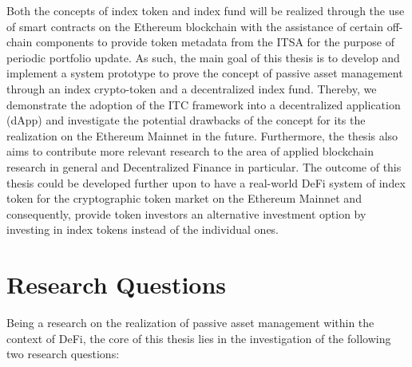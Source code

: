 
Both the concepts of index token and index fund will be realized through the use of smart contracts on the Ethereum blockchain with the assistance of certain off-chain components to provide token metadata from the ITSA for the purpose of periodic portfolio update. As such, the main goal of this thesis is to develop and implement a system prototype to prove the concept of passive asset management through an index crypto-token and a decentralized index fund. Thereby, we demonstrate the adoption of the ITC framework into a decentralized application (dApp) and investigate the potential drawbacks of the concept for its the realization on the Ethereum Mainnet in the future. Furthermore, the thesis also aims to contribute more relevant research to the area of applied blockchain research in general and Decentralized Finance in particular. The outcome of this thesis could be developed further upon to have a real-world DeFi system of index token for the cryptographic token market on the Ethereum Mainnet and consequently, provide token investors an alternative investment option by investing in index tokens instead of the individual ones.





\section{Research Questions}

Being a research on the realization of passive asset management within the context of DeFi, the core of this thesis lies in the investigation of the following two research questions:

